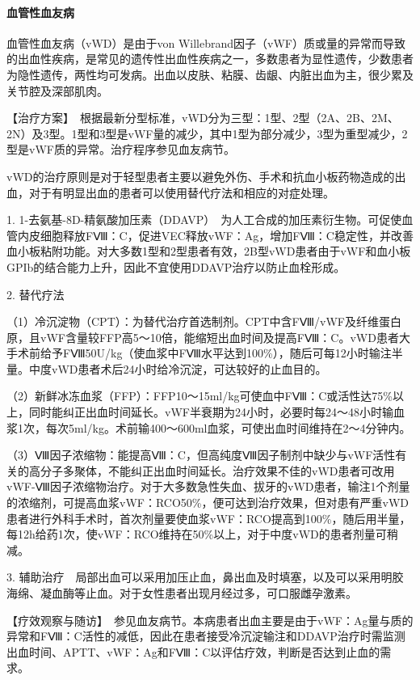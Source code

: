 \paragraph{血管性血友病}

血管性血友病（vWD）是由于von
Willebrand因子（vWF）质或量的异常而导致的出血性疾病，是常见的遗传性出血性疾病之一，多数患者为显性遗传，少数患者为隐性遗传，两性均可发病。出血以皮肤、粘膜、齿龈、内脏出血为主，很少累及关节腔及深部肌肉。

【治疗方案】　根据最新分型标准，vWD分为三型：1型、2型（2A、2B、2M、2N）及3型。1型和3型是vWF量的减少，其中1型为部分减少，3型为重型减少，2型是vWF质的异常。治疗程序参见血友病节。

vWD的治疗原则是对于轻型患者主要以避免外伤、手术和抗血小板药物造成的出血，对于有明显出血的患者可以使用替代疗法和相应的对症处理。

1.
1-去氨基-8D-精氨酸加压素（DDAVP）　为人工合成的加压素衍生物。可促使血管内皮细胞释放FⅧ：C，促进VEC释放vWF：Ag，增加FⅧ：C稳定性，并改善血小板粘附功能。对大多数1型和2型患者有效，2B型vWD患者由于vWF和血小板GPIb的结合能力上升，因此不宜使用DDAVP治疗以防止血栓形成。

2. 替代疗法

（1）冷沉淀物（CPT）：为替代治疗首选制剂。CPT中含FⅧ/vWF及纤维蛋白原，且vWF含量较FFP高5～10倍，能缩短出血时间及提高FⅧ：C。vWD患者大手术前给予FⅧ50U/kg（使血浆中FⅧ水平达到100\%），随后可每12小时输注半量。中度vWD患者术后24小时给冷沉淀，可达较好的止血目的。

（2）新鲜冰冻血浆（FFP）：FFP10～15ml/kg可使血中FⅧ：C或活性达75\%以上，同时能纠正出血时间延长。vWF半衰期为24小时，必要时每24～48小时输血浆1次，每次5ml/kg。术前输400～600ml血浆，可使出血时间维持在2～4分钟内。

（3）Ⅷ因子浓缩物：能提高Ⅷ：C，但高纯度Ⅷ因子制剂中缺少与vWF活性有关的高分子多聚体，不能纠正出血时间延长。治疗效果不佳的vWD患者可改用vWF-Ⅷ因子浓缩物治疗。对于大多数急性失血、拔牙的vWD患者，输注1个剂量的浓缩剂，可提高血浆vWF：RCO50\%，便可达到治疗效果，但对患有严重vWD患者进行外科手术时，首次剂量要使血浆vWF：RCO提高到100\%，随后用半量，每12h给药1次，使vWF：RCO维持在50\%以上，对于中度vWD的患者剂量可稍减。

3.
辅助治疗　局部出血可以采用加压止血，鼻出血及时填塞，以及可以采用明胶海绵、凝血酶等止血。对于女性患者出现月经过多，可口服雌孕激素。

【疗效观察与随访】　参见血友病节。本病患者出血主要是由于vWF：Ag量与质的异常和FⅧ：C活性的减低，因此在患者接受冷沉淀输注和DDAVP治疗时需监测出血时间、APTT、vWF：Ag和FⅧ：C以评估疗效，判断是否达到止血的需求。

